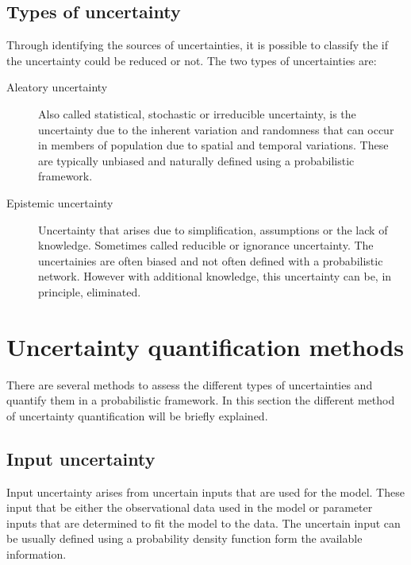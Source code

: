\subsection{Types of uncertainty}
Through identifying the sources of uncertainties, it is possible to classify the if the uncertainty could be reduced or not. The two types of uncertainties are:

\begin{description}
\item[Aleatory uncertainty] Also called statistical, stochastic or irreducible uncertainty, is the uncertainty due to the inherent variation and randomness that can occur in members of population due to spatial and temporal variations. These are typically unbiased and naturally defined using a probabilistic framework.
\item[Epistemic uncertainty] Uncertainty that arises due to simplification, assumptions or the lack of knowledge. Sometimes called reducible or ignorance uncertainty. The uncertainies are often biased and not often defined with a probabilistic network. However with additional knowledge, this uncertainty can be, in principle, eliminated.
\end{description}

\section{Uncertainty quantification methods}
There are several methods to assess the different types of uncertainties and quantify them in a probabilistic framework. In this section the different method of uncertainty quantification will be briefly explained.

\subsection{Input uncertainty}
Input uncertainty arises from uncertain inputs that are used for the model. These input that be either the observational data used in the model or parameter inputs that are determined to fit the model to the data. The uncertain input can be usually defined using a probability density function form the available information.\par

